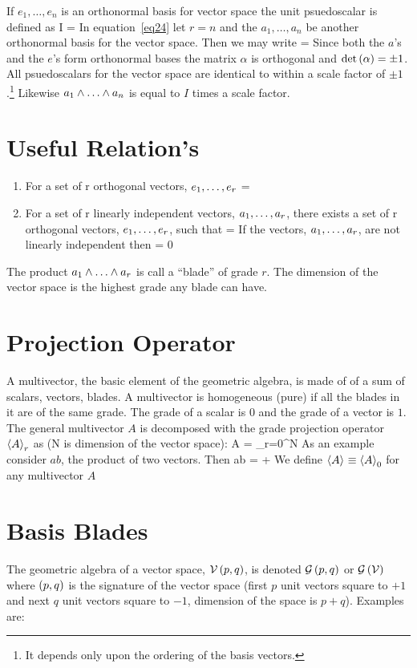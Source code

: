 If $e_{1},\dots,e_{n}$ is an orthonormal basis for vector space the unit psuedoscalar is defined as
\be
	I = 
\ee
In equation~\ref{eq24} let $r=n$ and the $a_{1},\dots,a_{n}$ be another orthonormal basis for the vector space.
Then we may write
\be
	 = \det\paren{\alpha}
\ee
Since both the $a$'s and the $e$'s form orthonormal bases the matrix $\alpha$ is orthogonal and 
$\det\left ( {\alpha} \right ) = \pm 1$.  All psuedoscalars for the vector space are identical to within a
scale factor of $\pm 1$.\footnote{It depends only upon the ordering of the basis vectors.}
Likewise $\wprod{a_{1}}{a_{n}}$ is equal to $I$ times a scale factor.

\section{Useful Relation's}
\begin{enumerate}
\item For a set of r orthogonal vectors, ${e_{1}},\dots,{e_{r}}$
\be
{} = 
\ee
\item For a set of r linearly independent vectors, ${a_{1}},\dots,{a_{r}}$, there exists
a set of r orthogonal vectors, ${e_{1}},\dots,{e_{r}}$, such that
\be\label{17}
 = 
\ee
If the vectors, ${a_{1}},\dots,{a_{r}}$, are not linearly independent then
\be
{} = 0
\ee
\end{enumerate}
The product $\wprod{a_{1}}{a_{r}}$ is call a ``blade'' of grade $r$. The
dimension of the vector space is the highest grade any blade can have.
\section{Projection Operator}
A multivector, the basic element of the geometric algebra, is made of of a sum of
scalars, vectors, blades. A multivector is homogeneous (pure) if all the blades in 
it are of the same grade.  The grade of a scalar is $0$ and the grade of a vector is
$1$. The general multivector $A$ is decomposed with the grade projection operator
$\left \langle {A}\right \rangle_{r}$ as (N is dimension of the vector space):
\be
A = \sum_{r=0}^{N}
\ee
As an example consider $ab$, the product of two vectors. Then
\be
ab = +
\ee
We define $\left \langle {A}\right \rangle_{} \equiv \left \langle {A}\right \rangle_{0}$ for any multivector $A$

\section{Basis Blades}\label{sect_Basis_Blades}
The geometric algebra of a vector space, $\mathcal{V}\left ( {p,q} \right )$, is denoted $\mathcal{G}\left ( {p,q} \right )$ 
or $\mathcal{G}\left ( {\mathcal{V}} \right )$ where $\left ( {p,q} \right )$
is the signature of the vector space (first $p$ unit vectors square to $+1$ and 
next $q$ unit vectors square to $-1$, dimension of the space is $p+q$). Examples are:

